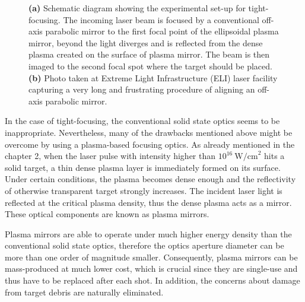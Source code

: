 \begin{figure}[h!]
	\centering
	\hspace{5mm}
	\caption{\textbf{(a)} Schematic diagram showing the experimental set-up for tight-focusing. The incoming laser beam is focused by a conventional off-axis parabolic mirror to the first focal point of the ellipsoidal plasma mirror, beyond the light diverges and is reflected from the dense plasma created on the surface of plasma mirror. The beam is then imaged to the second focal spot where the target should be placed. \textbf{(b)} Photo taken at Extreme Light Infrastructure (ELI) laser facility capturing a very long and frustrating procedure of aligning an off-axis parabolic mirror.}
	\label{fig:9}
\end{figure}

In the case of tight-focusing, the conventional solid state optics seems to be inappropriate. Nevertheless, many of the drawbacks mentioned above might be overcome by using a plasma-based focusing optics. As already mentioned in the chapter 2, when the laser pulse with intensity higher than $ 10^{16} \ \mathrm{W/cm}^{2} $ hits a solid target, a thin dense plasma layer is immediately formed on its surface. Under certain conditions, the plasma becomes dense enough and the reflectivity of otherwise transparent target strongly increases. The incident laser light is reflected at the critical plasma density, thus the dense plasma acts as a mirror. These optical components are known as plasma mirrors.

Plasma mirrors are able to operate under much higher energy density than the conventional solid state optics, therefore the optics aperture diameter can be more than one order of magnitude smaller. Consequently, plasma mirrors can be mass-produced at much lower cost, which is crucial since they are single-use and thus have to be replaced after each shot. In addition, the concerns about damage from target debris are naturally eliminated.

